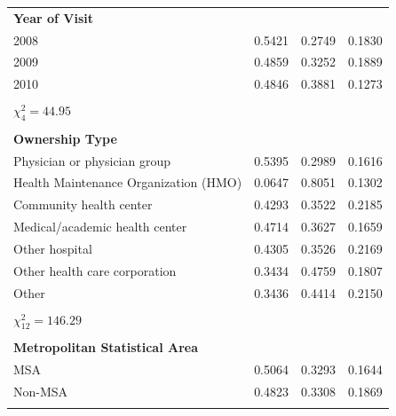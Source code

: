 \documentclass[12pt]{report}
\begin{document}
{\begin{center}
\begin{longtable}{lccc}
\hline \endfoot
\hline \hline \endlastfoot
\textbf{Year of Visit}                 &          &            &            \\
2008                                   & 0.5421   & 0.2749     & 0.1830     \\
2009                                   & 0.4859   & 0.3252     & 0.1889     \\
2010                                   & 0.4846   & 0.3881     & 0.1273     \\
                                       &          &            &            \\
$\chi^2_4 = 44.95$                     &          &            &            \\
                                       &          &            &            \\
\textbf{Ownership Type}                &          &            &            \\
Physician or physician group           & 0.5395   & 0.2989     & 0.1616     \\
Health Maintenance Organization (HMO)  & 0.0647   & 0.8051     & 0.1302     \\
Community health center                & 0.4293   & 0.3522     & 0.2185     \\
Medical/academic health center         & 0.4714   & 0.3627     & 0.1659     \\
Other hospital                         & 0.4305   & 0.3526     & 0.2169     \\
Other health care corporation          & 0.3434   & 0.4759     & 0.1807     \\
Other                                  & 0.3436   & 0.4414     & 0.2150     \\
                                       &          &            &            \\
$\chi^2_{12} = 146.29$                 &          &            &            \\
                                       &          &            &            \\
\textbf{Metropolitan Statistical Area} &          &            &            \\
MSA                                    & 0.5064   & 0.3293     & 0.1644     \\
Non-MSA                                & 0.4823   & 0.3308     & 0.1869     \\
                                       &          &            &            \\

\end{longtable}
\end{center}}
\end{document}
